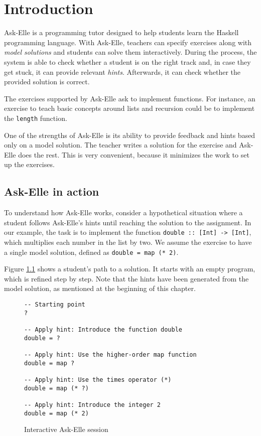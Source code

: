 \chapter{Introduction}
\label{sec:intro}

Ask-Elle \cite{2017askelle} is a programming tutor designed to help students learn the Haskell programming language. With Ask-Elle, teachers can specify exercises along with \emph{model solutions} and students can solve them interactively. During the process, the system is able to check whether a student is on the right track and, in case they get stuck, it can provide relevant \emph{hints}. Afterwards, it can check whether the provided solution is correct.

The exercises supported by Ask-Elle ask to implement functions. For instance, an exercise to teach basic concepts around lists and recursion could be to implement the \texttt{length} function.

One of the strengths of Ask-Elle is its ability to provide feedback and hints based only on a model solution. The teacher writes a solution for the exercise and Ask-Elle does the rest. This is very convenient, because it minimizes the work to set up the exercises.

\section{Ask-Elle in action}
\label{sec:intro-askelle-example-session}

To understand how Ask-Elle works, consider a hypothetical situation where a student follows Ask-Elle's hints until reaching the solution to the assignment. In our example, the task is to implement the function \texttt{double :: [Int] -> [Int]}, which multiplies each number in the list by two. We assume the exercise to have a single model solution, defined as \texttt{double = map (* 2)}.

Figure \ref{fig:interactive-session-double} shows a student's path to a solution. It starts with an empty program, which is refined step by step. Note that the hints have been generated from the model solution, as mentioned at the beginning of this chapter.

\begin{figure}
\begin{verbatim}
-- Starting point
?

-- Apply hint: Introduce the function double
double = ?

-- Apply hint: Use the higher-order map function
double = map ?

-- Apply hint: Use the times operator (*)
double = map (* ?)

-- Apply hint: Introduce the integer 2
double = map (* 2)
\end{verbatim}
\caption{Interactive Ask-Elle session}
\label{fig:interactive-session-double}
\end{figure}

